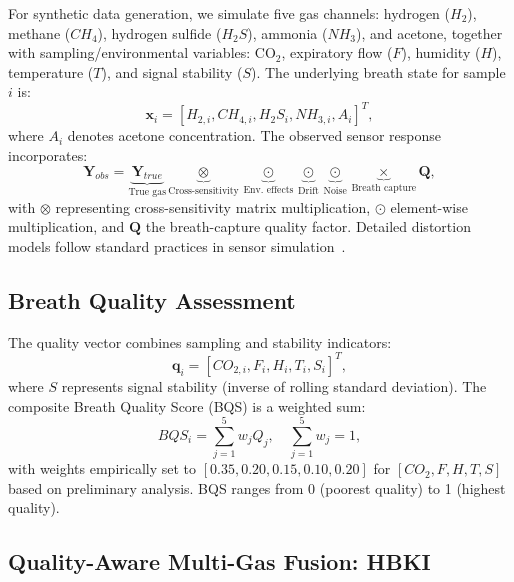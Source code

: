 \documentclass{ieeeaccess}
\begin{document}
For synthetic data generation, we simulate five gas channels: hydrogen ($H_2$), methane ($CH_4$), hydrogen sulfide ($H_2S$), ammonia ($NH_3$), and acetone, together with sampling/environmental variables: CO$_2$, expiratory flow ($F$), humidity ($H$), temperature ($T$), and signal stability ($S$). The underlying breath state for sample $i$ is:
\begin{equation}
\mathbf{x}_i = [H_{2,i},CH_{4,i},H_{2}S_i,NH_{3,i},A_i]^T,
\end{equation}
where $A_i$ denotes acetone concentration. The observed sensor response incorporates:
\begin{equation}
\mathbf{Y}_{obs} =
\underbrace{\mathbf{Y}_{true}}_{\text{True gas}}
\underbrace{\otimes}_{\text{Cross-sensitivity}}
\underbrace{\odot}_{\text{Env. effects}}
\underbrace{\odot}_{\text{Drift}}
\underbrace{\odot}_{\text{Noise}}
\underbrace{\times}_{\text{Breath capture}}
\mathbf{Q},
\end{equation}
with $\otimes$ representing cross-sensitivity matrix multiplication, $\odot$ element-wise multiplication, and $\mathbf{Q}$ the breath-capture quality factor. Detailed distortion models follow standard practices in sensor simulation~\cite{b5}.

\subsection{Breath Quality Assessment}

The quality vector combines sampling and stability indicators:
\begin{equation}
\mathbf{q}_i = [CO_{2,i}, F_i, H_i, T_i, S_i]^T,
\end{equation}
where $S$ represents signal stability (inverse of rolling standard deviation). The composite Breath Quality Score (BQS) is a weighted sum:
\begin{equation}
BQS_i = \sum_{j=1}^{5} w_j Q_j, \quad \sum_{j=1}^{5} w_j = 1,
\end{equation}
with weights empirically set to $[0.35, 0.20, 0.15, 0.10, 0.20]$ for $[CO_2, F, H, T, S]$ based on preliminary analysis. BQS ranges from 0 (poorest quality) to 1 (highest quality).

\subsection{Quality-Aware Multi-Gas Fusion: HBKI}
\end{document}
